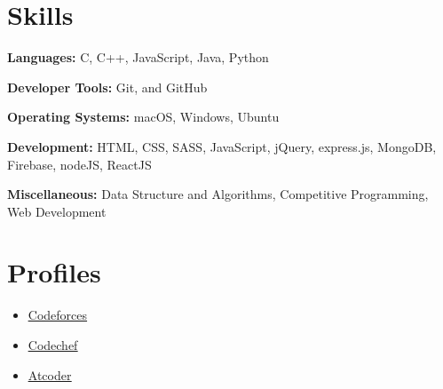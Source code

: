 \documentclass[letterpaper,11pt]{article}
\newcommand{\resumeItem}[1]{
  \item\small{
    {#1 \vspace{-2pt}}
  }
}
\newcommand{\resumeSubHeadingListStart}{\begin{itemize}[leftmargin=0.15in, label={}]}
\newcommand{\resumeSubHeadingListEnd}{\end{itemize}}
\newcommand{\resumeItemListStart}{\begin{itemize}}
\newcommand{\resumeItemListEnd}{\end{itemize}\vspace{-5pt}}
\begin{document}

\section{Skills}
  \vspace{2pt}
  \resumeSubHeadingListStart
    \small{\item{

  
    \textbf{Languages:}{ C, C++, JavaScript, Java, Python} \ \vspace{3pt}

    \textbf{Developer Tools:}{ Git, and GitHub} \ \vspace{3pt}

    \textbf{Operating Systems:}{ macOS, Windows, Ubuntu} \ \vspace{3pt}

    \textbf{Development:}{ HTML, CSS, SASS, JavaScript, jQuery, express.js, MongoDB, Firebase, nodeJS, ReactJS} \ \vspace{3pt}

    \textbf{Miscellaneous:}{ Data Structure and Algorithms, Competitive Programming, Web Development} \ \vspace{3pt}

}}
\resumeSubHeadingListEnd




\section{Profiles}
  \vspace{2pt}
  \resumeItemListStart
  \resumeItem{\underline{\href{https://codeforces.com/profile/govindtomar}{Codeforces}}}\resumeItem{\underline{\href{https://www.codechef.com/users/govindtomar21}{Codechef}}}\resumeItem{\underline{\href{https://atcoder.jp/users/404fixer}{Atcoder}}}
  \resumeItemListEnd

\end{document}
